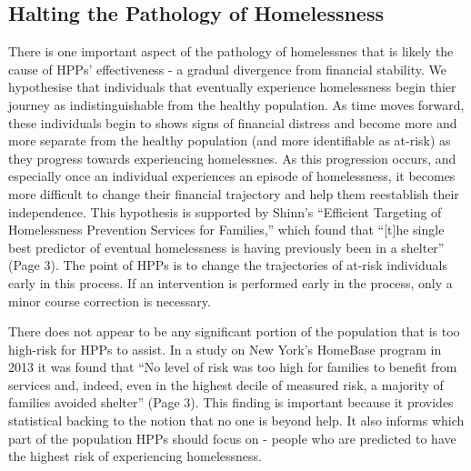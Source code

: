 \documentclass[utf8]{frontiersFPHY} %
\begin{document}
\subsection*{Halting the Pathology of Homelessness}
There is one important aspect of the pathology of homelessnes that is likely the cause of HPPs' effectiveness - a gradual divergence from financial stability. We hypothesise that individuals that eventually experience homelessness begin thier journey as indistinguishable from the healthy population. As time moves forward, these individuals begin to shows signs of financial distress and become more and more separate from the healthy population (and more identifiable as at-risk) as they progress towards experiencing homelessnes. As this progression occurs, and especially once an individual experiences an episode of homelessness, it becomes more difficult to change their financial trajectory and help them reestablish their independence. This hypothesis is supported by Shinn's ``Efficient Targeting of Homelessness Prevention Services for Families,'' which found that ``[t]he single best predictor of eventual homelessness is having previously been in a shelter'' \cite{shinn2019homelessness} (Page 3). The point of HPPs is to change the trajectories of at-risk individuals early in this process. If an intervention is performed early in the process, only a minor course correction is necessary. 

There does not appear to be any significant portion of the population that is too high-risk for HPPs to assist. In a study on New York's HomeBase program in 2013 it was found that ``No level of risk was too high for families to benefit from services and, indeed, even in the highest decile of measured risk, a majority of families avoided shelter'' \cite{shinn2013efficient} (Page 3). This finding is important because it provides statistical backing to the notion that no one is beyond help. It also informs which part of the population HPPs should focus on - people who are predicted to have the highest risk of experiencing homelessness.
\end{document}
